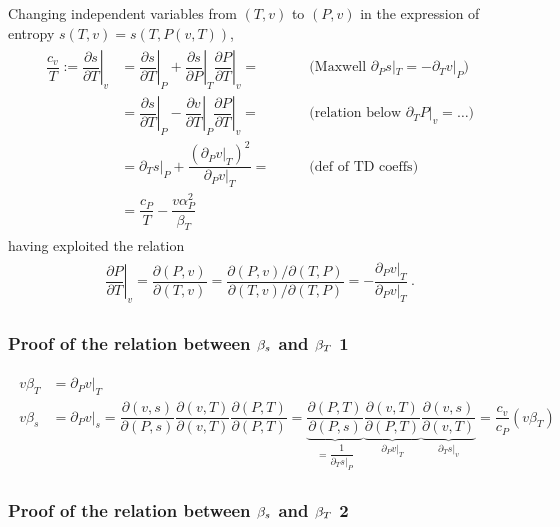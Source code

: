 \documentclass[letterpaper,10pt,english]{jupyterBook}
\begin{document}
\sphinxAtStartPar
Changing independent variables from \((T,v)\) to \((P,v)\) in the expression of entropy \(s(T,v) = s(T, P(v,T))\),
\begin{equation*}
\begin{split}\begin{aligned}
  \dfrac{c_v}{T} := \left.\dfrac{\partial s}{\partial T}\right|_v 
  & = \left.\dfrac{\partial s}{\partial T}\right|_P + \left.\dfrac{\partial s}{\partial P}\right|_T \left.\dfrac{\partial P}{\partial T}\right|_v = & \qquad \text{(Maxwell $\partial_P s|_T = - \partial_T v|_P$)} \\
  & = \left.\dfrac{\partial s}{\partial T}\right|_P - \left.\dfrac{\partial v}{\partial T}\right|_P \left.\dfrac{\partial P}{\partial T}\right|_v = & \qquad \text{(relation below $\partial_T P|_v = \dots$)} \\
  & = \partial_T s|_P + \dfrac{\left( \partial_P v |_T \right)^2}{\partial_P v |_T} = & \qquad \text{(def of TD coeffs)} \\
  & = \dfrac{c_P}{T} - \dfrac{ v \alpha_P^2}{\beta_T} 
\end{aligned}\end{split}
\end{equation*}
\sphinxAtStartPar
having exploited the relation
\begin{equation*}
\begin{split}\begin{aligned}
  \left.\dfrac{\partial P}{\partial T}\right|_v 
    = \dfrac{\partial(P,v)}{\partial (T,v)} 
    = \dfrac{\partial(P,v) / \partial(T,P)}{\partial (T,v) / \partial(T,P)} 
    = - \dfrac{\partial_P v|_T}{\partial_P v|_T} \ .
\end{aligned}\end{split}
\end{equation*}\subsubsection*{Proof of the relation between \protect\(\beta_s\protect\) and \protect\(\beta_T\protect\) \sphinxhyphen{} 1}
\begin{equation*}
\begin{split}\begin{aligned}
 v \beta_T & = \partial_P v |_T \\
 v \beta_s & = \partial_P v |_s 
 = \dfrac{\partial(v,s)}{\partial(P,s)} \dfrac{\partial(v,T)}{\partial(v,T)}  \dfrac{\partial(P,T)}{\partial(P,T)} 
 = \underbrace{\dfrac{\partial(P,T)}{\partial(P,s)}}_{= \dfrac{1}{\partial_T s|_P}} \underbrace{\dfrac{\partial(v,T)}{\partial(P,T)}}_{\partial_P v|_T} \underbrace{\dfrac{\partial(v,s)}{\partial(v,T)}}_{\partial_T s|_v} 
 = \dfrac{c_v}{c_P} \left( v \beta_T \right)
\end{aligned}\end{split}
\end{equation*}\subsubsection*{Proof of the relation between \protect\(\beta_s\protect\) and \protect\(\beta_T\protect\) \sphinxhyphen{} 2}
\end{document}
